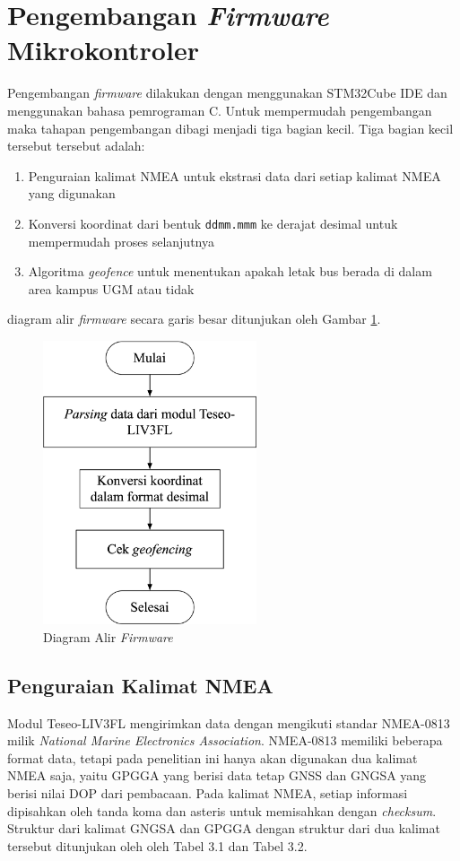 \section{Pengembangan \textit{Firmware} Mikrokontroler}
Pengembangan \textit{firmware} dilakukan dengan menggunakan STM32Cube IDE dan menggunakan bahasa pemrograman C. Untuk mempermudah pengembangan maka tahapan pengembangan dibagi menjadi tiga bagian kecil. Tiga bagian kecil tersebut tersebut adalah:
\begin{enumerate}
	\item Penguraian kalimat NMEA untuk ekstrasi data dari setiap kalimat NMEA yang digunakan
	\item Konversi koordinat dari bentuk \texttt{ddmm.mmm} ke derajat desimal untuk mempermudah proses selanjutnya
	\item Algoritma \textit{geofence} untuk menentukan apakah letak bus berada di dalam area kampus UGM atau tidak
\end{enumerate}
diagram alir \textit{firmware} secara garis besar ditunjukan oleh Gambar \ref{Fig: flowchart-firmware}.

\begin{figure}[H]
	\centering
	\includegraphics[width=6.3cm]{contents/chapter-3/firmware-diagram.png}
	\caption{Diagram Alir \textit{Firmware}}
	\label{Fig: flowchart-firmware}
\end{figure}


\subsection{Penguraian Kalimat NMEA}
Modul Teseo-LIV3FL mengirimkan data dengan mengikuti standar NMEA-0813 milik \textit{National Marine Electronics Association}. NMEA-0813 memiliki beberapa format data, tetapi pada penelitian ini hanya akan digunakan dua kalimat NMEA saja, yaitu GPGGA yang berisi data tetap GNSS dan GNGSA yang berisi nilai DOP dari pembacaan. Pada kalimat NMEA, setiap informasi dipisahkan oleh tanda koma dan asteris untuk memisahkan dengan \textit{checksum}. Struktur dari kalimat GNGSA dan GPGGA dengan struktur dari dua kalimat tersebut ditunjukan oleh oleh Tabel 3.1 dan Tabel 3.2.

